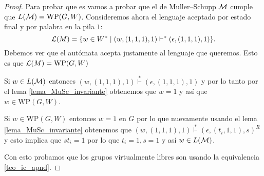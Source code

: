\documentclass[tesis.tex]{subfiles}
\begin{document}
\begin{proof}
	Para probar que es \ic vamos a probar que el \APD de Muller--Schupp $\cal M$ cumple que $L({\cal M})= \text{WP}(G,W)$.
	Consideremos ahora el lenguaje aceptado por estado final y por palabra en la pila $1$:
	\[
	{\cal L }(M) = \{  w \in W^* \mid (w,(1,1,1),1)   \vdash^*  (\epsilon, (1,1,1), 1)  \}.
	\]
	Debemos ver que el autómata acepta justamente al lenguaje que queremos. 
	Esto es que $ {\cal L }(M) = \text{WP}(G,W) $ 
	
	Si $w \in L(\cal M)$ entonces $(w, (1,1,1), 1) \overset{*}{\vdash} (\epsilon, (1,1,1), 1)$ y por lo tanto por el lema \ref{lema_MuSc_invariante} obtenemos que $w = 1$ y así que $w \in \text{WP}(G,W)$.
	
	Si $w \in \text{WP}(G,W)$ entonces $w = 1$ en $G$ por lo que nuevamente usando el lema \ref{lema_MuSc_invariante} obtenemos que $(w, (1,1,1), 1) \overset{*}{\vdash} (\epsilon, (t_{i},1,1), s)^{R}$
	y esto implica que $st_{i} = 1$ por lo que $t_{i} = 1, s =1$ y así $w \in L(\cal M)$.
	
	
	Con esto probamos que los grupos virtualmente libres son \ic usando la equivalencia \ref{teo_ic_apnd}.
	
\end{proof}
\end{document}
